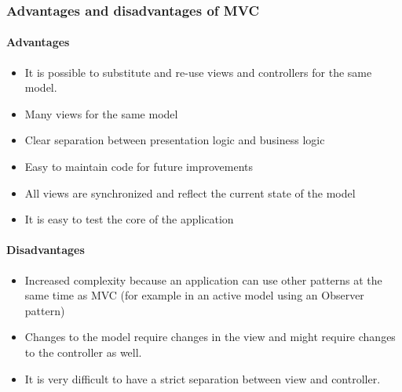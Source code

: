 \documentclass[a4paper,12pt]{article}
\begin{document}
\subsubsection*{Advantages and disadvantages of MVC}

\paragraph{Advantages}
\begin{itemize}
\item It is possible to substitute and re-use views and controllers for the same model.
\item Many views for the same model 
\item Clear separation between presentation logic and business logic
\item Easy to maintain code for future improvements
\item All views are synchronized and reflect the current state of the model 
\item It is easy to test the core of the application
\end{itemize}

\paragraph{Disadvantages}
\begin{itemize}
\item Increased complexity because an application can use other patterns at the same time as MVC (for example in an active model using an Observer pattern)
\item Changes to the model require changes in the view and might require changes to the controller as well.
\item It is very difficult to have a strict separation between view and controller. 
\end{itemize}

\end{document}
